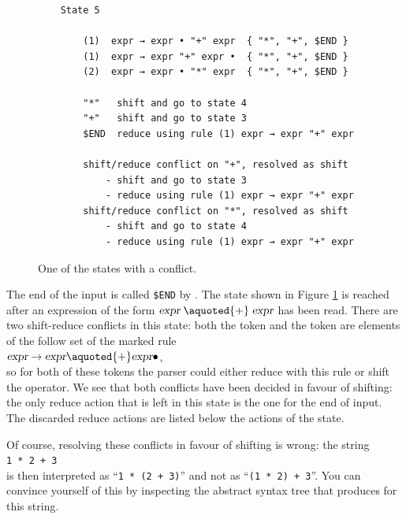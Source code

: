 \begin{figure}[!ht]
\centering
\begin{verbatim}
    State 5

        (1)  expr → expr • "+" expr  { "*", "+", $END }
        (1)  expr → expr "+" expr •  { "*", "+", $END }
        (2)  expr → expr • "*" expr  { "*", "+", $END }

        "*"   shift and go to state 4
        "+"   shift and go to state 3
        $END  reduce using rule (1) expr → expr "+" expr

        shift/reduce conflict on "+", resolved as shift
            - shift and go to state 3
            - reduce using rule (1) expr → expr "+" expr
        shift/reduce conflict on "*", resolved as shift
            - shift and go to state 4
            - reduce using rule (1) expr → expr "+" expr
\end{verbatim}
\vspace*{-0.3cm}
\caption{One of the states with a conflict.}
\label{fig:Conflicts.ipynb:state5}
\end{figure}

\noindent
The end of the input is called \texttt{\$END} by .  The state shown in Figure
\ref{fig:Conflicts.ipynb:state5} is reached after an expression of the form
$\textsl{expr}\; \aquoted{+} \;\textsl{expr}$ has been read.  There are two shift-reduce conflicts in this
state: both the token \aquoted{+} and the token \aquoted{*} are elements of the follow set of the marked rule
\\[0.2cm]
\hspace*{1.3cm}
$\textsl{expr} \rightarrow \textsl{expr} \aquoted{+} \textsl{expr} \bullet$,
\\[0.2cm]
so for both of these tokens the parser could either reduce with this rule or shift the operator.  We see that
both conflicts have been decided in favour of shifting: the only reduce action that is left in this state is
the one for the end of input.  The discarded reduce actions are listed below the actions of the state.

Of course, resolving these conflicts in favour of shifting is wrong: the string
\\[0.2cm]
\hspace*{1.3cm}
\texttt{1 * 2 + 3}
\\[0.2cm]
is then interpreted as ``\texttt{1 * (2 + 3)}'' and not as ``\texttt{(1 * 2) + 3}''.  You can convince yourself
of this by inspecting the abstract syntax tree that  produces for this string.

